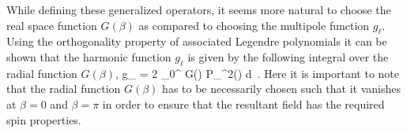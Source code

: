 While defining these generalized operators, it seems more natural to choose the real space function $G(\beta)$ as compared to choosing the multipole function $g_{\ell}$. Using the orthogonality property of associated Legendre polynomials it can be shown that the harmonic function $g_{\ell}$ is given by the following integral over the radial function $G(\beta)$,
%
\beq
g_{\ell} = 2 \pi {} \int _{0}^{\pi} G(\beta) P_{\ell}^{2}(\cos{\beta}) d\cos{\beta} \,. \label{eq:gb2bl}
\eeq
%
Here it is important to note that the radial function $G(\beta)$ has to be necessarily chosen such that it vanishes at $\beta=0$ and $\beta=\pi$ in order to ensure that the resultant field has the required spin properties. 

